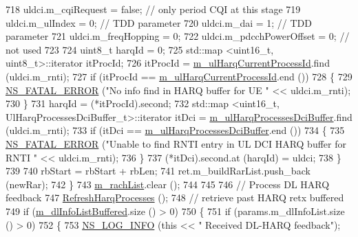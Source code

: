 \begin{DoxyCode}
718           uldci.m\_cqiRequest = \textcolor{keyword}{false}; \textcolor{comment}{// only period CQI at this stage}
719           uldci.m\_ulIndex = 0; \textcolor{comment}{// TDD parameter}
720           uldci.m\_dai = 1; \textcolor{comment}{// TDD parameter}
721           uldci.m\_freqHopping = 0;
722           uldci.m\_pdcchPowerOffset = 0; \textcolor{comment}{// not used}
723 
724           uint8\_t harqId = 0;
725           std::map <uint16\_t, uint8\_t>::iterator itProcId;
726           itProcId = \hyperlink{classns3_1_1FdMtFfMacScheduler_abdac9ae7be0c9b938eebf34dfb2f5126}{m\_ulHarqCurrentProcessId}.find (uldci.m\_rnti);
727           \textcolor{keywordflow}{if} (itProcId == \hyperlink{classns3_1_1FdMtFfMacScheduler_abdac9ae7be0c9b938eebf34dfb2f5126}{m\_ulHarqCurrentProcessId}.end ())
728             \{
729               \hyperlink{group__fatal_ga5131d5e3f75d7d4cbfd706ac456fdc85}{NS\_FATAL\_ERROR} (\textcolor{stringliteral}{"No info find in HARQ buffer for UE "} << uldci.m\_rnti);
730             \}
731           harqId = (*itProcId).second;
732           std::map <uint16\_t, UlHarqProcessesDciBuffer\_t>::iterator itDci = 
      \hyperlink{classns3_1_1FdMtFfMacScheduler_a43c0d140a807beae5125340c8df8dcdd}{m\_ulHarqProcessesDciBuffer}.find (uldci.m\_rnti);
733           \textcolor{keywordflow}{if} (itDci == \hyperlink{classns3_1_1FdMtFfMacScheduler_a43c0d140a807beae5125340c8df8dcdd}{m\_ulHarqProcessesDciBuffer}.end ())
734             \{
735               \hyperlink{group__fatal_ga5131d5e3f75d7d4cbfd706ac456fdc85}{NS\_FATAL\_ERROR} (\textcolor{stringliteral}{"Unable to find RNTI entry in UL DCI HARQ buffer for RNTI "} << 
      uldci.m\_rnti);
736             \}
737           (*itDci).second.at (harqId) = uldci;
738         \}
739 
740       rbStart = rbStart + rbLen;
741       ret.m\_buildRarList.push\_back (newRar);
742     \}
743   \hyperlink{classns3_1_1FdMtFfMacScheduler_a1d2f0501b8ad79cdbda0437a0efb417e}{m\_rachList}.clear ();
744 
745 
746   \textcolor{comment}{// Process DL HARQ feedback}
747   \hyperlink{classns3_1_1FdMtFfMacScheduler_a2da15ef7efa4bd5e5f5c2cf015b65d61}{RefreshHarqProcesses} ();
748   \textcolor{comment}{// retrieve past HARQ retx buffered}
749   \textcolor{keywordflow}{if} (\hyperlink{classns3_1_1FdMtFfMacScheduler_ac7f5da1ae0cf374d49f379b07c2c78a7}{m\_dlInfoListBuffered}.size () > 0)
750     \{
751       \textcolor{keywordflow}{if} (params.m\_dlInfoList.size () > 0)
752         \{
753           \hyperlink{group__logging_gafbd73ee2cf9f26b319f49086d8e860fb}{NS\_LOG\_INFO} (\textcolor{keyword}{this} << \textcolor{stringliteral}{" Received DL-HARQ feedback"});

\end{DoxyCode}

